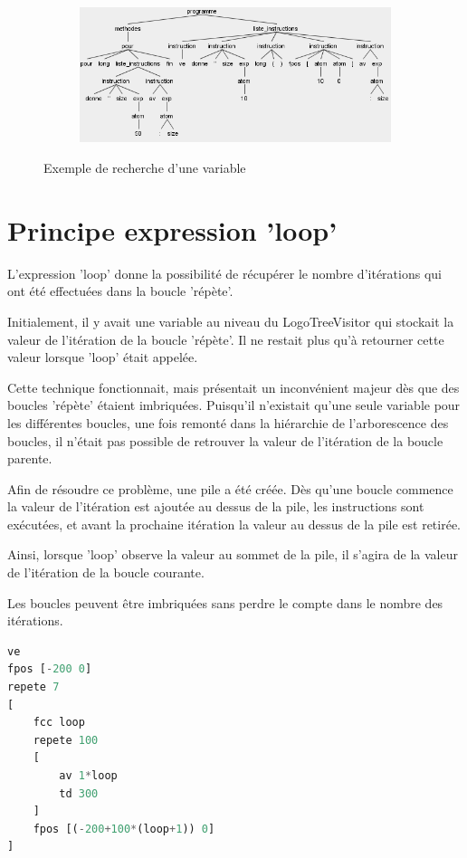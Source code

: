 \documentclass[a4paper,11pt]{article}
\begin{document}
\begin{figure}[!h]
\begin{subfigure}[t]{.15\textwidth}
	\end{subfigure}
	~
	\begin{subfigure}[t]{0.7\textwidth}
		\includegraphics[width=\textwidth]{img/var_tree}
	\end{subfigure}
	\caption{Exemple de recherche d'une variable}
\end{figure}

\section{Principe expression 'loop'}
L'expression 'loop' donne la possibilité de récupérer le nombre d'itérations qui ont été effectuées dans la boucle 'répète'. 

Initialement, il y avait une variable au niveau du LogoTreeVisitor qui stockait la valeur de l'itération de la boucle 'répète'. Il ne restait plus qu'à retourner cette valeur lorsque 'loop' était appelée. 

Cette technique fonctionnait, mais présentait un inconvénient majeur dès que des boucles 'répète' étaient imbriquées. Puisqu'il n'existait qu'une seule variable pour les différentes boucles, une fois remonté dans la hiérarchie de l'arborescence des boucles, il n'était pas possible de retrouver la valeur de l'itération de la boucle parente. 

Afin de résoudre ce problème, une pile a été créée. Dès qu'une boucle commence la valeur de l'itération est ajoutée au dessus de la pile, les instructions sont exécutées, et avant la prochaine itération la valeur au dessus de la pile est retirée. 

Ainsi, lorsque 'loop' observe la valeur au sommet de la pile, il s'agira de la valeur de l'itération de la boucle courante.

Les boucles peuvent être imbriquées sans perdre le compte dans le nombre des itérations. 
\begin{lstlisting}[language=Python]
ve
fpos [-200 0]
repete 7
[
	fcc loop
	repete 100
	[
		av 1*loop
		td 300
	]
	fpos [(-200+100*(loop+1)) 0]	
]
\end{lstlisting}
\end{document}
